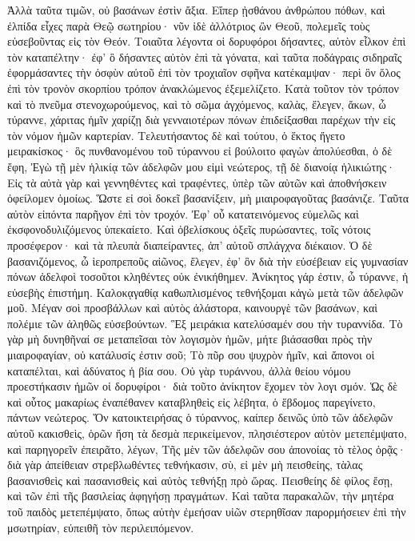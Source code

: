 Ἀλλὰ ταῦτα τιμῶν, οὐ βασάνων ἐστὶν ἄξια. 
Εἴπερ ᾐσθάνου ἀνθρώπου πόθων, καὶ ἐλπίδα εἶχες παρὰ Θεῷ σωτηρίου· 
νῦν ἰδὲ ἀλλότριος ὢν Θεοῦ, πολεμεῖς τοὺς εὐσεβοῦντας εἰς τὸν Θεόν. 
Τοιαῦτα λέγοντα οἱ δορυφόροι δήσαντες, αὐτὸν εἷλκον ἐπὶ τὸν καταπέλτην· 
ἐφ' ὃ δήσαντες αὐτὸν ἐπὶ τὰ γόνατα, καὶ ταῦτα ποδάγραις σιδηραῖς ἐφορμάσαντες τὴν ὀσφὺν αὐτοῦ ἐπὶ τὸν τροχιαῖον σφῆνα κατέκαμψαν· περὶ ὃν ὅλος ἐπὶ τὸν τρονὸν σκορπίου τρόπον ἀνακλώμενος ἐξεμελίζετο. 
Κατὰ τοῦτον τὸν τρόπον καὶ τὸ πνεῦμα στενοχωρούμενος, καὶ τὸ σῶμα ἀγχόμενος, καλὰς, ἔλεγεν, ἄκων, 
ὦ τύραννε, χάριτας ἡμῖν χαρίζῃ διὰ γενναιοτέρων πόνων ἐπιδείξασθαι παρέχων τὴν εἰς τὸν νόμον ἡμῶν καρτερίαν. 
Τελευτήσαντος δὲ καὶ τούτου, ὁ ἕκτος ἤγετο μειρακίσκος· ὃς πυνθανομένου τοῦ τύραννου εἰ βούλοιτο φαγὼν ἀπολύεσθαι, ὁ δὲ ἔφη, 
Ἐγὼ τῇ μὲν ἡλικίᾳ τῶν ἀδελφῶν μου εἰμὶ νεώτερος, τῇ δὲ διανοίᾳ ἡλικιώτης· 
Εἰς τὰ αὐτὰ γὰρ καὶ γεννηθέντες καὶ τραφέντες, ὑπὲρ τῶν αὐτῶν καὶ ἀποθνήσκειν ὀφείλομεν ὁμοίως. 
Ὥστε εἰ σοὶ δοκεῖ βασανίξειν, μὴ μιαιροφαγοῦτας βασάνιζε. 
Ταῦτα αὐτὸν εἰπόντα παρῆγον ἐπὶ τὸν τροχόν. 
Ἐφ' οὗ κατατεινόμενος εὐμελῶς καὶ ἐκσφονοδυλιζόμενος ὑπεκαίετο. 
Καὶ ὀβελίσκους ὀξεῖς πυρώσαντες, τοῖς νότοις προσέφερον· καὶ τὰ πλευπὰ διαπείραντες, ἀπ' αὐτοῦ σπλάγχνα διέκαιον. 
Ὁ δὲ βασανιζόμενος, ὦ ἱεροπρεποῦς αἰῶνος, ἔλεγεν, ἐφ' ὃν διὰ τὴν εὐσέβειαν εἰς γυμνασίαν πόνων ἀδελφοὶ τοσοῦτοι κληθέντες οὐκ ἐνικήθημεν. 
Ἀνίκητος γάρ ἐστιν, ὦ τύραννε, ἡ εὐσεβὴς ἐπιστήμη. 
Καλοκᾳγαθίᾳ καθωπλισμένος τεθνήξομαι κἀγὼ μετὰ τῶν ἀδελφῶν μοῦ. 
Μέγαν σοὶ προσβάλλων καὶ αὐτὸς ἀλάστορα, καινουργὲ τῶν βασάνων, καὶ πολέμιε τῶν ἀληθῶς εὐσεβούντων. 
Ἓξ μειράκια κατελύσαμέν σου τὴν τυραννίδα. 
Τὸ γὰρ μὴ δυνηθῆναί σε μεταπεῖσαι τὸν λογισμὸν ἡμῶν, μήτε βιάσασθαι πρὸς τὴν μιαιροφαγίαν, οὐ κατάλυσίς ἐστιν σοῦ; 
Τὸ πῦρ σου ψυχρὸν ἡμῖν, καὶ ἄπονοι οἱ καταπέλται, καὶ ἀδύνατος ἡ βία σου. 
Οὐ γὰρ τυράννου, ἀλλὰ θείου νόμου προεστήκασιν ἡμῶν οἱ δορυφίροι· διὰ τοῦτο ἀνίκητον ἕχομεν τὸν λογι σμόν. 
Ὡς δὲ καὶ οὗτος μακαρίως ἐναπέθανεν καταβληθεὶς εἰς λέβητα, ὁ ἕβδομος παρεγίνετο, πάντων νεώτερος. 
Ὅν κατοικτειρήσας ὁ τύραννος, καίπερ δεινῶς ὑπὸ τῶν ἀδελφῶν αὐτοῦ κακισθεὶς, ὁρῶν ἤση τὰ δεσμὰ περικείμενον, 
πλησιέστερον αὐτὸν μετεπέμψατο, καὶ παρηγορεῖν ἐπειρᾶτο, λέγων, 
Τῆς μὲν τῶν ἀδελφῶν σου ἀπονοίας τὸ τὲλος ὁρᾷς· διὰ γὰρ ἀπείθειαν στρεβλωθέντες τεθνήκασιν, σὺ, εἰ μὲν μὴ πεισθείης, τὰλας βασανισθεὶς καὶ πασανισθεὶς καὶ αὐτὸς τεθνήξῃ πρὸ ὥρας. 
Πεισθείης δὲ φίλος ἔσῃ, καὶ τῶν ἐπὶ τῆς βασιλείας ἀφηγήσῃ πραγμάτων. 
Καὶ ταῦτα παρακαλῶν, τὴν μητέρα τοῦ παιδὸς μετεπέμψατο, ὄπως αὐτὴν ἐμεήσαν υἱῶν στερηθῖσαν παρορμήσειεν ἐπὶ τὴν μσωτηρίαν, εὐπειθῆ τὸν περιλειπόμενον. 
